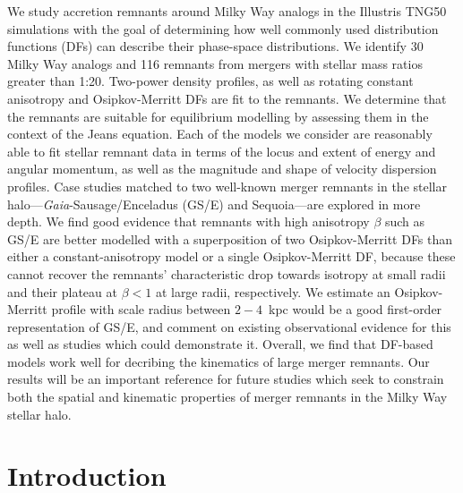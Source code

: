 We study accretion remnants around Milky Way analogs in the Illustris TNG50 simulations with the goal of determining how well commonly used distribution functions (DFs) can describe their phase-space distributions. We identify 30 Milky Way analogs and 116 remnants from mergers with stellar mass ratios greater than 1:20. Two-power density profiles, as well as rotating constant anisotropy and Osipkov-Merritt DFs are fit to the remnants. We determine that the remnants are suitable for equilibrium modelling by assessing them in the context of the Jeans equation. Each of the models we consider are reasonably able to fit stellar remnant data in terms of the locus and extent of energy and angular momentum, as well as the magnitude and shape of velocity dispersion profiles. Case studies matched to two well-known merger remnants in the stellar halo---\textit{Gaia}-Sausage/Enceladus (GS/E) and Sequoia---are explored in more depth. We find good evidence that remnants with high anisotropy $\beta$ such as GS/E are better modelled with a superposition of two Osipkov-Merritt DFs than either a constant-anisotropy model or a single Osipkov-Merritt DF, because these cannot recover the remnants' characteristic drop towards isotropy at small radii and their plateau at $\beta < 1$ at large radii, respectively. We estimate an Osipkov-Merritt profile with scale radius between $2-4$~kpc would be a good first-order representation of GS/E, and comment on existing observational evidence for this as well as studies which could demonstrate it. Overall, we find that DF-based models work well for decribing the kinematics of large merger remnants. Our results will be an important reference for future studies which seek to constrain both the spatial and kinematic properties of merger remnants in the Milky Way stellar halo.




\section{Introduction}
\label{ch4:sec:introduction}

